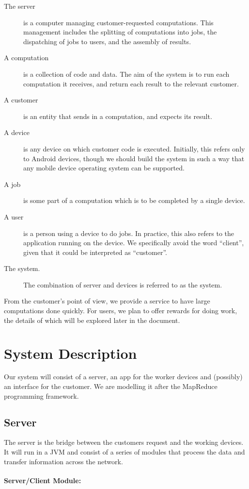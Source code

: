 \documentclass[a4paper,10pt]{article}
\begin{document}
\begin{description}
      \item [The server] is a computer managing customer-requested computations. This management includes the splitting of computations into jobs, the dispatching of jobs to users, and the assembly of results.
      \item [A computation] is a collection of code and data. The aim of the system is to run each computation it receives, and return each result to the relevant customer.
      \item [A customer] is an entity that sends in a computation, and expects its result.
      \item [A device] is any device on which customer code is executed. Initially, this refers only to Android devices, though we should build the system in such a way that any mobile device operating system can be supported.
      \item [A job] is some part of a computation which is to be completed by a single device.
      \item [A user] is a person using a device to do jobs. In practice, this also refers to the application running on the device. We specifically avoid the word “client”, given that it could be interpreted as “customer”.
      \item [The system.] The combination of server and devices is referred to as the system.
\end{description}
From the customer’s point of view, we provide a service to have large computations done quickly. For users, we plan to offer rewards for doing work, the details of which will be explored later in the document.
\section{System Description}
Our system will consist of a server, an app for the worker devices and (possibly) an interface for the customer. We are modelling it after the MapReduce programming framework.

\subsection{Server}
The server is the bridge between the customers request and the working devices. It will run in a JVM and consist of a series of modules that process the data and transfer information across the network. 

\paragraph{Server/Client Module:}
\end{document}
